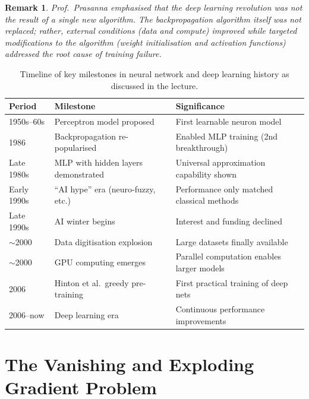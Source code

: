 \documentclass[12pt,a4paper]{article}
\newtheorem{remark}{Remark}[section]
\begin{document}
\begin{remark}
\label{rem:not_single_breakthrough}
Prof.\ Prasanna emphasised that the deep learning revolution was
\emph{not} the result of a single new algorithm.  The backpropagation
algorithm itself was not replaced; rather, external conditions
(data and compute) improved while targeted modifications to the
algorithm (weight initialisation and activation functions) addressed
the root cause of training failure.
\end{remark}

\begin{table}[htbp]
\centering
\caption{Timeline of key milestones in neural network and deep learning
         history as discussed in the lecture.}
\label{tab:timeline}
\begin{tabular}{@{}lll@{}}
\toprule
\textbf{Period} & \textbf{Milestone} & \textbf{Significance} \\
\midrule
1950s--60s & Perceptron model proposed
           & First learnable neuron model \\
1986       & Backpropagation re-popularised
           & Enabled MLP training (2nd breakthrough) \\
Late 1980s & MLP with hidden layers demonstrated
           & Universal approximation capability shown \\
Early 1990s & ``AI hype'' era (neuro-fuzzy, etc.)
            & Performance only matched classical methods \\
Late 1990s & AI winter begins
           & Interest and funding declined \\
$\sim$2000 & Data digitisation explosion
           & Large datasets finally available \\
$\sim$2000 & GPU computing emerges
           & Parallel computation enables larger models \\
2006       & Hinton et al.\ greedy pre-training
           & First practical training of deep nets \\
2006--now  & Deep learning era
           & Continuous performance improvements \\
\bottomrule
\end{tabular}
\end{table}

\section{The Vanishing and Exploding Gradient Problem}
\label{sec:vgp}
\end{document}
